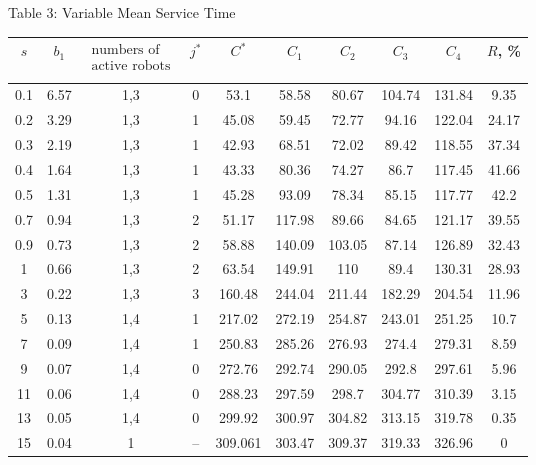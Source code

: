 \documentclass[11pt]{article}
\begin{document}
\begin{center}
Table 3: Variable Mean Service Time
\\ \vspace{2mm}
\begin{tabular}{|c|c|c|c|c|c|c|c|c|c|}
  \hline
$s$&  $b_1$ &    $\begin{array}{c}
  \text{numbers of} \\
  \text{active robots} \\
\end{array}$ & $j^*$&  $C^*$&    $C_1$&    $C_2$& $C_3$& $C_4$& $R$, \%\\
\hline
0.1&    6.57&   1,3&  0&  53.1&   58.58&  80.67&  104.74& 131.84& 9.35\\
0.2&    3.29&   1,3&  1&  45.08&  59.45&  72.77&  94.16&  122.04& 24.17\\
0.3&    2.19&   1,3&  1&  42.93&  68.51&  72.02&  89.42&  118.55& 37.34\\
0.4&    1.64&   1,3&  1&  43.33&  80.36&  74.27&  86.7&   117.45& 41.66\\
0.5&    1.31&   1,3&  1&  45.28&  93.09&  78.34&  85.15&  117.77& 42.2\\
0.7&    0.94&   1,3&  2&  51.17&  117.98& 89.66&  84.65&  121.17& 39.55\\
0.9&    0.73&   1,3&  2&  58.88&  140.09& 103.05& 87.14&  126.89& 32.43\\
1&  0.66&   1,3&  2&  63.54&  149.91& 110&    89.4&   130.31& 28.93\\
3&  0.22&   1,3&  3&  160.48& 244.04& 211.44& 182.29& 204.54& 11.96\\
5&  0.13&   1,4&  1&  217.02& 272.19& 254.87& 243.01& 251.25& 10.7\\
7&  0.09&   1,4&  1&  250.83& 285.26& 276.93& 274.4&  279.31& 8.59\\
9&  0.07&   1,4&  0&  272.76& 292.74& 290.05& 292.8&  297.61& 5.96\\
11& 0.06&   1,4&  0&  288.23& 297.59& 298.7&  304.77& 310.39& 3.15\\
13& 0.05&   1,4&  0&  299.92& 300.97& 304.82& 313.15& 319.78& 0.35\\
15& 0.04&   1&  --& 309.061&    303.47& 309.37& 319.33& 326.96& 0\\
\hline
\end{tabular}
\end{center}
\end{document}
